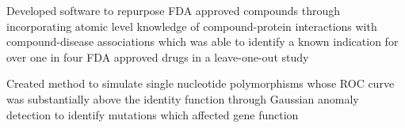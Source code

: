 \documentclass[letterpaper]{deedy-resume} %
\begin{document}
\begin{minipage}[t]{0.66\textwidth}
\begin{tightitemize}
\end{tightitemize}





\sectionspace %



\begin{tightitemize}
\item Developed software to repurpose FDA approved compounds through incorporating atomic level knowledge of compound-protein interactions with compound-disease associations  which was able to identify a known indication for over one in four FDA approved drugs in a leave-one-out study
\end{tightitemize}

\sectionspace %



\begin{tightitemize}
\item Created method to simulate single nucleotide polymorphisms whose ROC curve was substantially above the identity function through Gaussian anomaly detection to identify mutations which affected gene function
\end{tightitemize}

\sectionspace %




\end{minipage}
\end{document}
